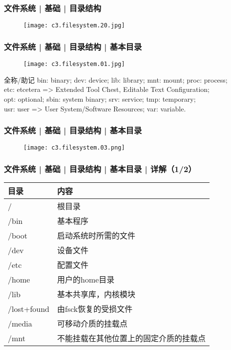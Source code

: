 \begin{frame}
  \frametitle{文件系统 | 基础 | \alert{目录结构}}
  \begin{figure}
    \centering
    \texttt{[image: c3.filesystem.20.jpg]}
  \end{figure}
\end{frame}

\begin{frame}
  \frametitle{文件系统 | 基础 | 目录结构 | \alert{基本目录}}
  \begin{figure}
    \centering
    \texttt{[image: c3.filesystem.01.jpg]}
  \end{figure}
  \pause
  \begin{block}{全称/助记}
    bin: binary; dev: device; lib: library; mnt: mount; proc: process;\\
  etc: etcetera => Extended Tool Chest, Editable Text Configuration;\\
  opt: optional; sbin: system binary; srv: service; tmp: temporary;\\
  usr: user => User System/Software Resources; var: variable.
\end{block}
\end{frame}

\begin{frame}
  \frametitle{文件系统 | 基础 | 目录结构 | \alert{基本目录}}
  \begin{figure}
    \centering
    \texttt{[image: c3.filesystem.03.png]}
  \end{figure}
\end{frame}

\begin{frame}
  \frametitle{文件系统 | 基础 | 目录结构 | \alert{基本目录} | 详解（1/2）}
  \begin{table}
    \centering
    \begin{tabular}{ll}
      \hline
      \rowcolor{blue!50}目录 & 内容\\
      \hline
      / & 根目录\\
      /bin & 基本程序\\
      /boot & 启动系统时所需的文件\\
      /dev & 设备文件\\
      /etc & 配置文件\\
      /home & 用户的home目录\\
      /lib & 基本共享库，内核模块\\
      /lost+found & 由fsck恢复的受损文件\\
      /media & 可移动介质的挂载点\\
      /mnt & 不能挂载在其他位置上的固定介质的挂载点\\
      \hline
    \end{tabular}
  \end{table}
\end{frame}

